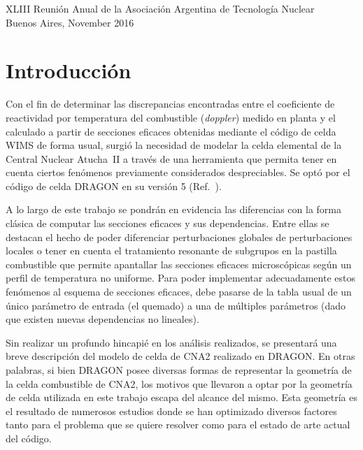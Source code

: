 \documentclass[11pt]{article}
\begin{document}
\vfill

\begin{center}
\begin{small}
XLIII Reunión Anual de la Asociación Argentina de Tecnología Nuclear\\
Buenos Aires, November 2016
\end{small}
\end{center}

\addtolength{\textheight}{-2cm}

\pagebreak


\tableofcontents
\pagebreak

\section{Introducción}

Con el fin de determinar las discrepancias encontradas entre el coeficiente de reactividad por temperatura del combustible (\emph{doppler}) medido en planta y el calculado a partir de secciones eficaces obtenidas mediante el código de celda WIMS de forma usual, surgió la necesidad de modelar la celda elemental de la Central Nuclear Atucha~II a través de una herramienta que permita tener en cuenta ciertos fenómenos previamente considerados despreciables. Se optó por el código de celda DRAGON en su versión 5 (Ref.~\cite{handbook-dragon}).

A lo largo de este trabajo se pondrán en evidencia las diferencias con la forma clásica de computar las secciones eficaces y sus dependencias. Entre ellas se destacan el hecho de poder diferenciar perturbaciones globales de perturbaciones locales o tener en cuenta el tratamiento resonante de subgrupos en la pastilla combustible que permite apantallar las secciones eficaces microscópicas según un perfil de temperatura no uniforme. Para poder implementar adecuadamente estos fenómenos al esquema de secciones eficaces, debe pasarse de la tabla usual de un único parámetro de entrada (el quemado) a una de múltiples parámetros (dado que existen nuevas dependencias no lineales).

Sin realizar un profundo hincapié en los análisis realizados, se presentará una breve descripción del modelo de celda de CNA2 realizado en DRAGON. En otras palabras, si bien DRAGON posee diversas formas de representar la geometría de la celda combustible de CNA2, los motivos que llevaron a optar por la geometría de celda utilizada en este trabajo escapa del alcance del mismo. Esta geometría es el resultado de numerosos estudios donde se han optimizado diversos factores tanto para el problema que se quiere resolver como para el estado de arte actual del código.
\end{document}
